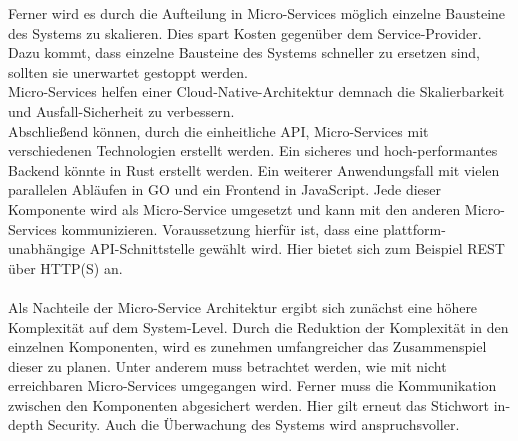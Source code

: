 Ferner wird es durch die Aufteilung in Micro-Services möglich einzelne Bausteine des Systems zu skalieren. Dies spart Kosten gegenüber dem Service-Provider. Dazu kommt, dass einzelne Bausteine des Systems schneller zu ersetzen sind, sollten sie unerwartet gestoppt werden. \\
Micro-Services helfen einer Cloud-Native-Architektur demnach die Skalierbarkeit und Ausfall-Sicherheit zu verbessern.\\
Abschließend können, durch die einheitliche API, Micro-Services mit verschiedenen Technologien erstellt werden. Ein sicheres und hoch-performantes Backend könnte in Rust erstellt werden. Ein weiterer Anwendungsfall mit vielen parallelen Abläufen in GO und ein Frontend in JavaScript. Jede dieser Komponente wird als Micro-Service umgesetzt und kann mit den anderen Micro-Services kommunizieren. Voraussetzung hierfür ist, dass eine plattform-unabhängige API-Schnittstelle gewählt wird. Hier bietet sich zum Beispiel REST über HTTP(S) an.\cite{newman_building_2021}\\\\
Als Nachteile der Micro-Service Architektur ergibt sich zunächst eine höhere Komplexität auf dem System-Level. Durch die Reduktion der Komplexität in den einzelnen Komponenten, wird es zunehmen umfangreicher das Zusammenspiel dieser zu planen. Unter anderem muss betrachtet werden, wie mit nicht erreichbaren Micro-Services umgegangen wird. Ferner muss die Kommunikation zwischen den Komponenten abgesichert werden. Hier gilt erneut das Stichwort in-depth Security. Auch die Überwachung des Systems wird anspruchsvoller. \cite{newman_building_2021}

